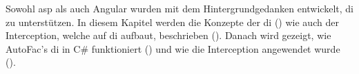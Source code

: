 
Sowohl \gls{asp} als auch Angular wurden mit dem Hintergrundgedanken entwickelt, \gls{di} zu unterstützen. In diesem Kapitel werden die Konzepte der \gls{di} () wie auch der Interception, welche auf \gls{di} aufbaut, beschrieben (). Danach wird gezeigt, wie AutoFac's \gls{di} in C\# funktioniert () und wie die Interception angewendet wurde ().
